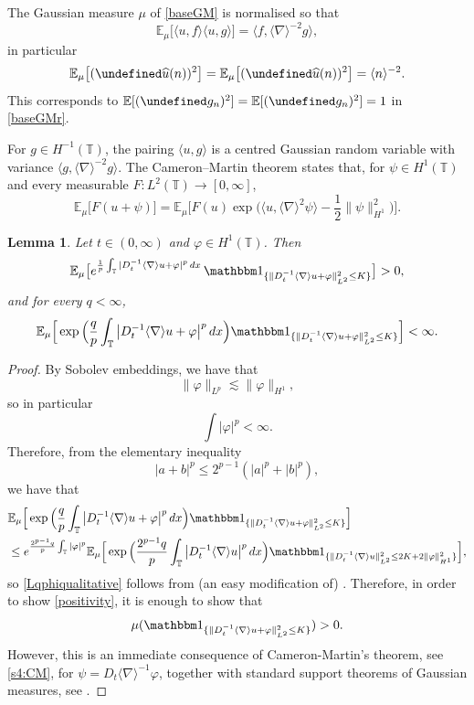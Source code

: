 \documentclass[letterpaper, 11pt,  reqno]{amsart}
\newtheorem{lemma}[theorem]{Lemma}
\theoremstyle{definition}
\newcommand{\1}{\mathbbm 1}
\newcommand{\T}{\mathbb{T}}
\newcommand{\0}{\mathbf 0}
\newcommand{\E}{\mathbb{E}}
\newcommand{\nb}{\nabla}
\newcommand{\ft}{\widehat}
\newcommand{\les}{\lesssim}
\newcommand{\jb}[1]
{\langle #1 \rangle}
\newcommand{\ind}{\mathbbm 1}
\newcommand{\ph}{\varphi}
\renewcommand{\ft}{\widehat}
\numberwithin{equation}{section}
\numberwithin{theorem}{section}
\let\Re=\undefined\DeclareMathOperator*{\Re}{Re}
\let\Im=\undefined\DeclareMathOperator*{\Im}{Im}
\newcommand{\WW}[1]{e^{\frac1p\int_\T|D_t^{-1}\jb\nb u+#1|^p\,dx}\,\ind_{\{\|D_t^{-1}\jb\nb u+#1\|_{L^2}^2\le K\}}}
\begin{document}
The Gaussian measure $\mu$ of \eqref{baseGM} is normalised so that
\begin{equation}\label{s4:cov}
\E_\mu\big[\jb{u,f}\jb{u,g}\big]=\jb{f,\jb\nb^{-2}g},
\end{equation}
in particular
\begin{equation}
\E_\mu\big[(\Re\ft u(n))^2\big]=\E_\mu\big[(\Im\ft u(n))^2\big]=\jb n^{-2}.
\end{equation}
This corresponds to $\E[(\Re g_n)^2]=\E[(\Im g_n)^2]=1$ in
\eqref{baseGMr}.
 
For $g\in H^{-1}(\T)$, the pairing $\jb{u,g}$ is a centred Gaussian random
variable with variance $\jb{g,\jb\nb^{-2}g}$. The Cameron--Martin theorem
\cite[Corollary 2.4.3]{Bogachev} states that, for $\psi\in H^1(\T)$ and every
measurable $F:L^2(\T)\to[0,\infty]$,
\begin{equation}\label{s4:CM}
\E_\mu\big[F(u+\psi)\big]=\E_\mu\Big[F(u)\exp\Big(\jb{u,\jb\nb^2\psi}-\frac12\|\psi\|_{H^1}^2\Big)\Big].
\end{equation}
 
 
 
\begin{lemma}\label{s4:LEM:int}
Let $t\in(0,\infty)$ and $\ph\in H^1(\T)$. Then
\begin{equation} \label{positivity}
    \E_\mu\big[\WW{\ph}\big]>0,
\end{equation}
and for every $q<\infty$,
\begin{equation}\label{Lqphiqualitative}
    \E_\mu\Big[\exp\Big(\frac qp\int_\T\big|D_t^{-1}\jb\nb u+\ph\big|^p\,dx\Big)\ind_{\{\|D_t^{-1}\jb\nb u+\ph\|_{L^2}^2\le K\}}\Big]<\infty .
\end{equation}
\end{lemma}
 
\begin{proof}

By Sobolev embeddings, we have that 
$$ \| \ph\|_{L^p}\les \|\ph\|_{H^1}, $$
so in particular 
$$ \int |\ph|^p < \infty.$$
Therefore, from the elementary inequality 
$$|a+b|^p \le 2^{p-1} (|a|^p + |b|^p),$$
we have that 
\begin{align*}
    & \E_\mu\Big[\exp\Big(\frac qp\int_\T\big|D_t^{-1}\jb\nb u+\ph\big|^p\,dx\Big)\ind_{\{\|D_t^{-1}\jb\nb u+\ph\|_{L^2}^2\le K\}}\Big] \\
    &\le e^{\frac {2^{p-1}q}{p}\int_\T |\ph|^p}\E_\mu\Big[\exp\Big(\frac {2^{p-1}q}{p}\int_\T\big|D_t^{-1}\jb\nb u\big|^p\,dx \Big)\ind_{\{\|D_t^{-1}\jb\nb u\|_{L^2}^2\le 2K + 2\|\ph\|_{H^1}^2\}}\Big],
\end{align*}
so \eqref{Lqphiqualitative} follows from (an easy modification of) \cite[Proposition 3.1]{TolWeb}. Therefore, in order to show \eqref{positivity}, it is enough to show that 
$$\mu(\ind_{\{\|D_t^{-1}\jb\nb u+\ph\|_{L^2}^2\le K\}}) > 0. $$
However, this is an immediate consequence of Cameron-Martin's theorem, see \eqref{s4:CM}, for $\psi = D_t\jb\nb^{-1}\ph$, together with standard support theorems of Gaussian measures, see \cite[Theorem 3.6.1]{Bogachev}.
\end{proof}
\end{document}
